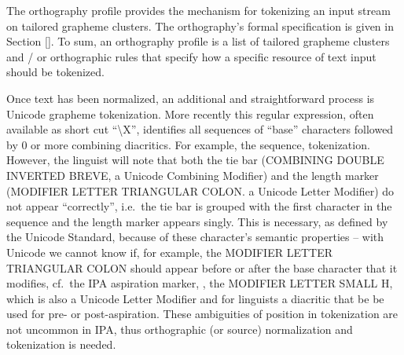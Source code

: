 The orthography profile provides the mechanism for tokenizing an input stream on tailored grapheme clusters. The orthography's formal specification is given in Section \ref{}. To sum, an orthography profile is a list of tailored grapheme clusters and / or orthographic rules that specify how a specific resource of text input should be tokenized. 

Once text has been normalized, an additional and straightforward process is Unicode grapheme tokenization. More recently this regular expression, often available as short cut ``\textbackslash{X}'', identifies all sequences of ``base'' characters followed by 0 or more combining diacritics. For example, the sequence, %
tokenization. However, the linguist will note that both the tie bar (COMBINING DOUBLE INVERTED BREVE, a Unicode Combining Modifier) and the length marker (MODIFIER LETTER TRIANGULAR COLON. a Unicode Letter Modifier) do not appear ``correctly'', i.e.~the tie bar is grouped with the first character in the sequence and the length marker appears singly. This is necessary, as defined by the Unicode Standard, because of these character's semantic properties -- with Unicode we cannot know if, for example, the MODIFIER LETTER TRIANGULAR COLON should appear before or after the base character that it modifies, cf.~the IPA aspiration marker, , the MODIFIER LETTER SMALL H, which is also a Unicode Letter Modifier and for linguists a diacritic that be be used for pre- or post-aspiration. These ambiguities of position in tokenization are not uncommon in IPA, thus orthographic (or source) normalization and tokenization is needed.

